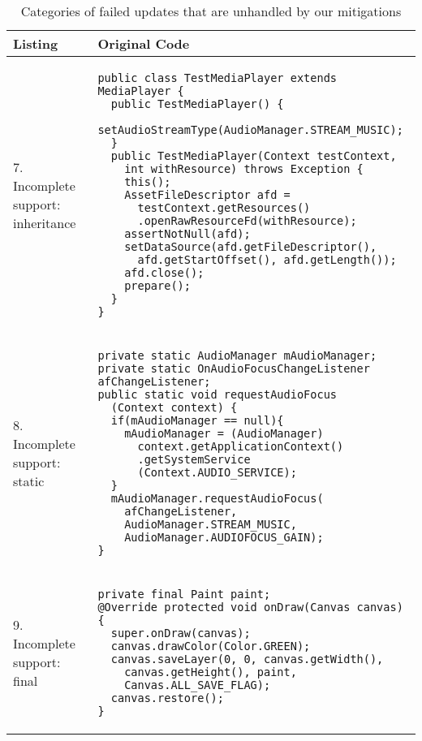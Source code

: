 \begin{table}
	\caption{Categories of failed updates that are unhandled by our mitigations}\label{tab:mitigatefail}
\centering
\begin{tabular}{|p{}|p{}|}
\hline
\textbf{Listing}
  &
  \textbf{Original Code}
 \\ \hline
7. Incomplete support: inheritance
&
\begin{lstlisting}
public class TestMediaPlayer extends MediaPlayer {
  public TestMediaPlayer() {
    setAudioStreamType(AudioManager.STREAM_MUSIC);
  }
  public TestMediaPlayer(Context testContext,
    int withResource) throws Exception {
    this();
    AssetFileDescriptor afd =
      testContext.getResources()
      .openRawResourceFd(withResource);
    assertNotNull(afd);
    setDataSource(afd.getFileDescriptor(),
      afd.getStartOffset(), afd.getLength());
    afd.close();
    prepare();
  }
}
\end{lstlisting}
\\ \hline
8. Incomplete support: static
&
\begin{lstlisting}
private static AudioManager mAudioManager;
private static OnAudioFocusChangeListener afChangeListener;
public static void requestAudioFocus
  (Context context) {
  if(mAudioManager == null){
    mAudioManager = (AudioManager)
      context.getApplicationContext()
      .getSystemService
      (Context.AUDIO_SERVICE);
  }
  mAudioManager.requestAudioFocus(
    afChangeListener,
    AudioManager.STREAM_MUSIC,
    AudioManager.AUDIOFOCUS_GAIN);
}
\end{lstlisting}
\\ \hline
9. Incomplete support: final
&
\begin{lstlisting}
private final Paint paint;
@Override protected void onDraw(Canvas canvas) {
  super.onDraw(canvas);
  canvas.drawColor(Color.GREEN);
  canvas.saveLayer(0, 0, canvas.getWidth(),
    canvas.getHeight(), paint,
    Canvas.ALL_SAVE_FLAG);
  canvas.restore();
}
\end{lstlisting}
\\ \hline
 \end{tabular}
 \end{table}


